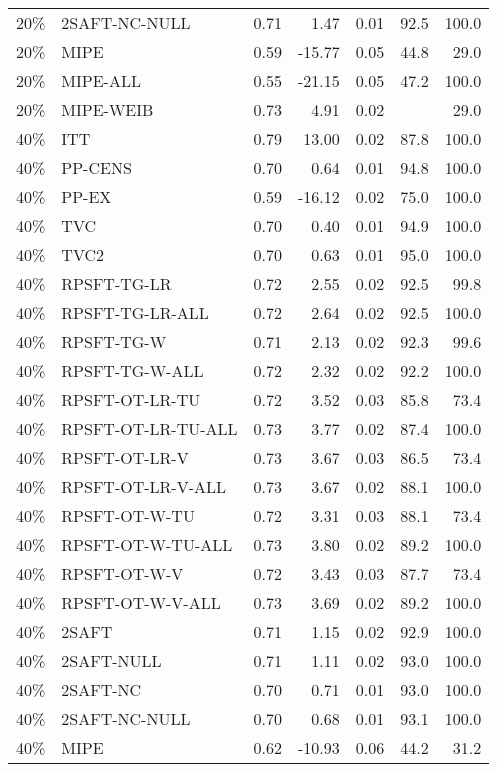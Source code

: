 \begin{table}[ht]
{\begin{tabular}{llrrrrr}
  20\% & 2SAFT-NC-NULL & 0.71 & 1.47 & 0.01 & 92.5 & 100.0 \\ 
  20\% & MIPE & 0.59 & -15.77 & 0.05 & 44.8 & 29.0 \\ 
  20\% & MIPE-ALL & 0.55 & -21.15 & 0.05 & 47.2 & 100.0 \\ 
  20\% & MIPE-WEIB & 0.73 & 4.91 & 0.02 &  & 29.0 \\ 
   \hline
40\% & ITT & 0.79 & 13.00 & 0.02 & 87.8 & 100.0 \\ 
  40\% & PP-CENS & 0.70 & 0.64 & 0.01 & 94.8 & 100.0 \\ 
  40\% & PP-EX & 0.59 & -16.12 & 0.02 & 75.0 & 100.0 \\ 
  40\% & TVC & 0.70 & 0.40 & 0.01 & 94.9 & 100.0 \\ 
  40\% & TVC2 & 0.70 & 0.63 & 0.01 & 95.0 & 100.0 \\ 
   \hline
40\% & RPSFT-TG-LR & 0.72 & 2.55 & 0.02 & 92.5 & 99.8 \\ 
  40\% & RPSFT-TG-LR-ALL & 0.72 & 2.64 & 0.02 & 92.5 & 100.0 \\ 
  40\% & RPSFT-TG-W & 0.71 & 2.13 & 0.02 & 92.3 & 99.6 \\ 
  40\% & RPSFT-TG-W-ALL & 0.72 & 2.32 & 0.02 & 92.2 & 100.0 \\ 
  40\% & RPSFT-OT-LR-TU & 0.72 & 3.52 & 0.03 & 85.8 & 73.4 \\ 
  40\% & RPSFT-OT-LR-TU-ALL & 0.73 & 3.77 & 0.02 & 87.4 & 100.0 \\ 
  40\% & RPSFT-OT-LR-V & 0.73 & 3.67 & 0.03 & 86.5 & 73.4 \\ 
  40\% & RPSFT-OT-LR-V-ALL & 0.73 & 3.67 & 0.02 & 88.1 & 100.0 \\ 
   \hline
40\% & RPSFT-OT-W-TU & 0.72 & 3.31 & 0.03 & 88.1 & 73.4 \\ 
  40\% & RPSFT-OT-W-TU-ALL & 0.73 & 3.80 & 0.02 & 89.2 & 100.0 \\ 
  40\% & RPSFT-OT-W-V & 0.72 & 3.43 & 0.03 & 87.7 & 73.4 \\ 
  40\% & RPSFT-OT-W-V-ALL & 0.73 & 3.69 & 0.02 & 89.2 & 100.0 \\ 
   \hline
40\% & 2SAFT & 0.71 & 1.15 & 0.02 & 92.9 & 100.0 \\ 
  40\% & 2SAFT-NULL & 0.71 & 1.11 & 0.02 & 93.0 & 100.0 \\ 
  40\% & 2SAFT-NC & 0.70 & 0.71 & 0.01 & 93.0 & 100.0 \\ 
  40\% & 2SAFT-NC-NULL & 0.70 & 0.68 & 0.01 & 93.1 & 100.0 \\ 
  40\% & MIPE & 0.62 & -10.93 & 0.06 & 44.2 & 31.2 \\ 

\end{tabular}}
\end{table}
